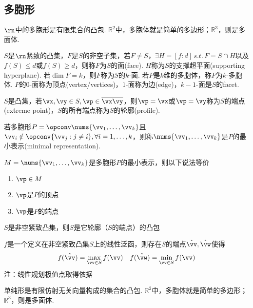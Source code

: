 \subsection{多胞形}
\begin{definition}
$\rn$中的多胞形是有限集合的凸包. $\mathbb{R}^2$中，多胞体就是简单的多边形；$\mathbb{R}^3$，则是多面体.
\end{definition}
\begin{definition}
\rm $S$是$\rn$紧致的凸集，$F$是$S$的非空子集，若$F\ne S$，$\exists H=[f:d]\,s.t.\,F=S\cap H$以及$f(S)\leq d$或$f(S)\geq d$，则称$F$为$S$的面(face). $H$称为$S$的支撑超平面(supporting hyperplane). 若$\dim F=k$，则$F$称为$S$的$k$-面. 若$P$是$k$维的多胞体，称$P$为$k$-多胞体. $P$的$0$-面称为顶点(vertex/vertices)，$1$-面称为边(edge)，$k-1$-面是$S$的facet.
\end{definition}
\begin{definition}[端点]
\rm $S$是凸集，若$\vx,\vy\in S,\vp\in\overline{\vx\vy}$，则$\vp=\vx$或$\vp=\vy$称为$S$的端点(extreme point)，$S$的所有端点称为$S$的轮廓(profile).
\end{definition}
\begin{definition}[最小表示]
\rm 若多胞形$P=\opconv\nums{\vv_1,\ldots,\vv_k}$且$\vv_i\notin\opconv\{\vv_j:j\ne i\},\forall i=1,\dots,k$，则称$\nums{\vv_1,\ldots,\vv_k}$是$P$的最小表示(minimal representation).
\end{definition}
\begin{theorem}
$M=\nums{\vv_1,\ldots,\vv_k}$是多胞形$P$的最小表示，则以下说法等价
\begin{enumerate}
	\itemsep -3pt
	\item $\vp\in M$
	\item $\vp$是$P$的顶点
	\item $\vp$是$P$的端点
\end{enumerate}
\end{theorem}
\begin{theorem}
$S$是非空紧致凸集，则$S$是它轮廓（$S$的端点）的凸包
\end{theorem}
\begin{theorem}
$f$是一个定义在非空紧致凸集$S$上的线性泛函，则存在$S$的端点$\hat{\vv},\hat{\vw}$使得
\[f(\hat{\vv})=\max_{\vv\in S}f(\vv)\quad f(\hat{\vw})=\min_{\vv\in S}f(\vv)\]
注：线性规划极值点取得依据
\end{theorem}
\begin{definition}
单纯形是有限仿射无关向量构成的集合的凸包. $\mathbb{R}^2$中，多胞体就是简单的多边形；$\mathbb{R}^3$，则是多面体.
\end{definition}

